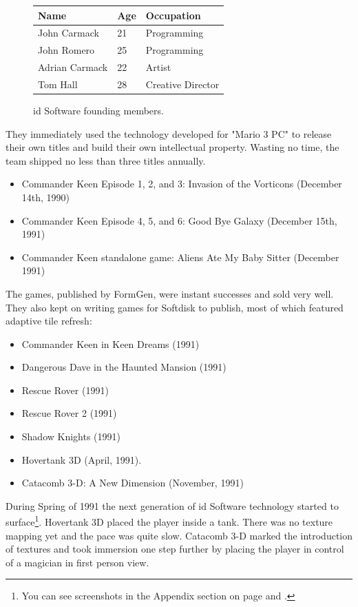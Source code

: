 \documentclass[book.tex]{subfiles}
\begin{document}
 \begin{figure}[H]
\centering  
\begin{tabularx}{\textwidth}{ X  X  X  }
  \toprule
  \textbf{Name} &  \textbf{Age} & \textbf{Occupation} \\
  \toprule 
   John Carmack & 21 &  Programming\\
   John Romero & 25 &  Programming\\
   Adrian Carmack & 22 &  Artist\\
   Tom Hall & 28 &  Creative Director\\
     \toprule
\end{tabularx}
\caption{id Software founding members.}\label{fig:Id Software team}
\end{figure}
\pagebreak
They immediately used the technology developed for "Mario 3 PC" to release their own titles and build their own intellectual property. Wasting no time, the team shipped no less than three titles annually.
\begin{itemize}
    \item Commander Keen Episode 1, 2, and 3: Invasion of the Vorticons (December 14th, 1990)
    \item Commander Keen Episode 4, 5, and 6: Good Bye Galaxy (December 15th, 1991)
    \item Commander Keen standalone game: Aliens Ate My Baby Sitter (December 1991)
\end{itemize}
The games, published by FormGen, were instant successes and sold very well. They also kept on writing games for Softdisk to publish, most of which featured adaptive tile refresh:
\begin{itemize}
  \item Commander Keen in Keen Dreams (1991)
  \item Dangerous Dave in the Haunted Mansion (1991)
  \item Rescue Rover (1991)
  \item Rescue Rover 2 (1991)
  \item Shadow Knights (1991)
  \item Hovertank 3D (April, 1991).
  \item Catacomb 3-D: A New Dimension (November, 1991)
\end{itemize}
During Spring of 1991 the next generation of id Software technology started to surface\footnote{You can see screenshots in the Appendix section on page \pageref{hovertank3d_screenshot} and \pageref{catacomb3d_screenshot}.}. Hovertank 3D placed the player inside a tank. There was no texture mapping yet and the pace was quite slow. Catacomb 3-D marked the introduction of textures and took immersion one step further by placing the player in control of a magician in first person view. \\
\par
\end{document}
